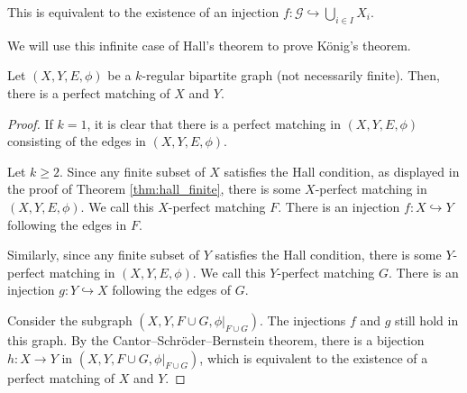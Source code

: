 \begin{remark}
  This is equivalent to the existence of an injection $f\colon \mathcal{G}\hookrightarrow \bigcup_{i\in I}X_i$.
\end{remark}
We will use this infinite case of Hall's theorem to prove König's theorem. 
\begin{theorem}
  Let $\left(X,Y,E,\phi\right)$ be a $k$-regular bipartite graph (not necessarily finite). Then, there is a perfect matching of $X$ and $Y$.\label{thm:konig}
\end{theorem}
\begin{proof}
  If $k = 1$, it is clear that there is a perfect matching in $\left(X,Y,E,\phi\right)$ consisting of the edges in $\left(X,Y,E,\phi\right)$.\newline

  Let $k\geq 2$. Since any finite subset of $X$ satisfies the Hall condition, as displayed in the proof of Theorem \ref{thm:hall_finite}, there is some $X$-perfect matching in $\left(X,Y,E,\phi\right)$. We call this $X$-perfect matching $F$. There is an injection $f\colon X\hookrightarrow Y$ following the edges in $F$.\newline

  Similarly, since any finite subset of $Y$ satisfies the Hall condition, there is some $Y$-perfect matching in $\left(X,Y,E,\phi\right)$. We call this $Y$-perfect matching $G$. There is an injection $g\colon Y\hookrightarrow X$ following the edges of $G$.\break

  Consider the subgraph $\left(X,Y,F\cup G,\phi|_{F\cup G}\right)$. The injections $f$ and $g$ still hold in this graph. By the Cantor--Schröder--Bernstein theorem, there is a bijection $h\colon X\rightarrow Y$ in $\left(X,Y,F\cup G,\phi|_{F\cup G}\right)$, which is equivalent to the existence of a perfect matching of $X$ and $Y$.
\end{proof}
